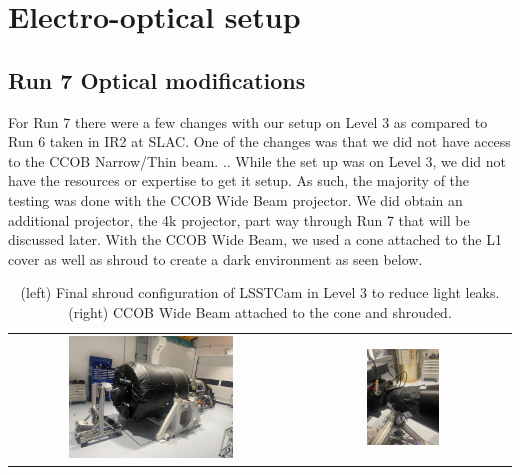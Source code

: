 


\section{Electro-optical setup}\label{electro-optical-setup}

\subsection{Run 7 Optical modifications}\label{run-7-optical-modifications}

For Run 7 there were a few changes with our setup on Level 3 as compared
to Run 6 taken in IR2 at SLAC. One of the changes was that we did not
have access to the CCOB Narrow/Thin beam. .. While the set up was on
Level 3, we did not have the resources or expertise to get it setup. As
such, the majority of the testing was done with the CCOB Wide Beam
projector. We did obtain an additional projector, the 4k projector, part
way through Run 7 that will be discussed later. With the CCOB Wide Beam,
we used a cone attached to the L1 cover as well as shroud to create a
dark environment as seen below.

\begin{table}[htbp]
\centering
\begin{tabular}{cc}
    \includegraphics[width=0.6\textwidth]{sections/figures/Camera_Shroud.jpg} &
    \includegraphics[width=0.35\textwidth]{sections/figures/CCOB_Wide_Shroud.jpg} \\
\end{tabular}
\caption{(left) Final shroud configuration of LSSTCam in Level 3 to reduce light leaks. (right) CCOB Wide Beam attached to the cone and shrouded.}
\end{table}

